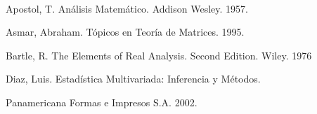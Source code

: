 \begin{titlepage}
\begin{minipage}{0.85\linewidth}
\begin{minipage}{0.85\linewidth}
\begin{resumen}
    \end{resumen}
\end{minipage}
\vspace*{5pt}\\
\footnotesize
%  
    
\end{minipage}
\vspace{5pt}
\begin{thebibliography}{99}

Apostol, T. An\'alisis Matem\'atico. Addison Wesley. 1957.

Asmar, Abraham. T\'opicos en Teor\'ia de Matrices. 1995.

Bartle, R. The Elements of Real Analysis. Second Edition. Wiley. 1976  

Diaz, Luis. Estad\'istica Multivariada: Inferencia y M\'etodos.

Panamericana Formas e Impresos S.A. 2002.
\end{thebibliography}
\end{titlepage}
\author{%
\vspace{2pt}\\
 Margarita Pati\~no Jaramillo,\vspace{2pt} \\
   Instituto tecn\'ologico Metropolitano,\vspace{2pt} \\
    \hspace*{-2cm}\texttt{\scriptsize margaritapatino@itm.edu.co}\vspace{20pt} \\
    John Jairo Garc\'{i}a Mora,\vspace{2pt} \\
   Instituto tecn\'ologico Metropolitano,\vspace{2pt} \\
    \hspace*{-2cm}\texttt{\scriptsize jhongarcia@itm.edu.co}\vspace{20pt} \\
         }

